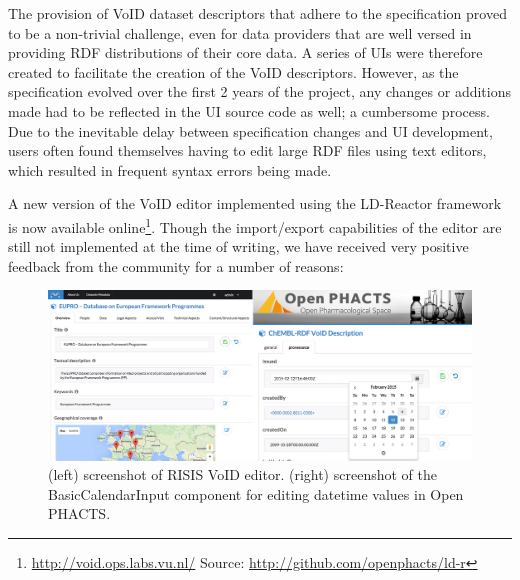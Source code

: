 \documentclass{llncs}
\begin{document}
The provision of VoID dataset descriptors that adhere to the specification proved to be a non-trivial challenge, even for data providers that are well versed in providing RDF distributions of their core data. A series of UIs were therefore created to facilitate the creation of the VoID descriptors. However, as the specification evolved over the first 2 years of the project, any changes or additions made had to be reflected in the UI source code as well; a cumbersome process. Due to the inevitable delay between specification changes and UI development, users often found themselves having to edit large RDF files using text editors, which resulted in frequent syntax errors being made.

A new version of the VoID editor implemented using the LD-Reactor framework is now available online\footnote{\url{http://void.ops.labs.vu.nl/} Source: \url{http://github.com/openphacts/ld-r}}. Though the  import/export capabilities of the editor are still not implemented at the time of writing, we have received very positive feedback from the community for a number of reasons:

\begin{figure}[tb]
\center
  \includegraphics[width=1\linewidth]{images/opsRISIS.jpg}
  \caption{(left) screenshot of RISIS VoID editor. (right) screenshot of the BasicCalendarInput component for editing datetime values in Open PHACTS.}
  \label{fig:opsLdr}
\end{figure}
\end{document}
